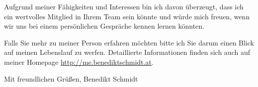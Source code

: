 \documentclass[12pt]{article}
\begin{document}
Aufgrund meiner Fähigkeiten und Interessen bin ich davon überzeugt, dass ich ein wertvolles Mitglied in Ihrem Team sein könnte und würde mich freuen, wenn wir uns bei einem persönlichen Gespräche kennen lernen könnten. \par
Falls Sie mehr zu meiner Person erfahren möchten bitte ich Sie darum einen Blick auf meinen Lebenslauf zu werfen. Detaillierte Informationen finden sich auch auf meiner Homepage \url{http://me.benediktschmidt.at}. \par
Mit freundlichen Grüßen,
Benedikt Schmidt
\end{document}

